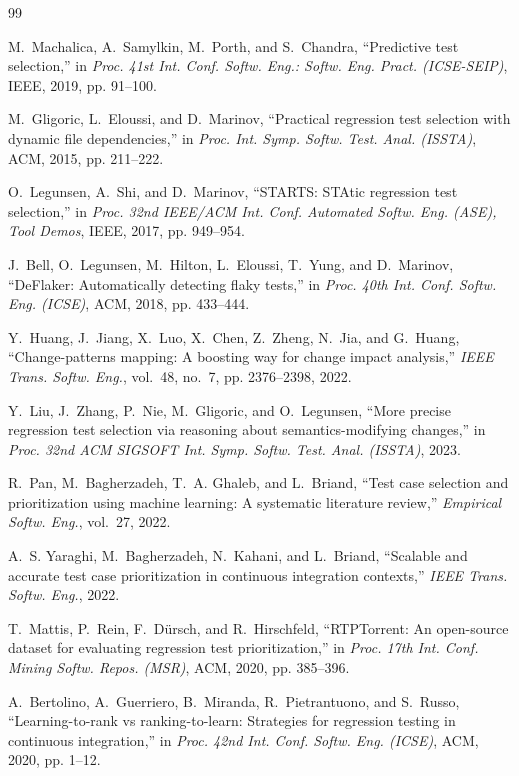 \documentclass[10pt,conference]{IEEEtran}
\begin{document}
\balance
\begin{thebibliography}{99}

M.~Machalica, A.~Samylkin, M.~Porth, and S.~Chandra, ``Predictive test selection,'' in \emph{Proc. 41st Int. Conf. Softw. Eng.: Softw. Eng. Pract. (ICSE-SEIP)}, IEEE, 2019, pp. 91--100.

M.~Gligoric, L.~Eloussi, and D.~Marinov, ``Practical regression test selection with dynamic file dependencies,'' in \emph{Proc. Int. Symp. Softw. Test. Anal. (ISSTA)}, ACM, 2015, pp. 211--222.

O.~Legunsen, A.~Shi, and D.~Marinov, ``{STARTS}: {STAtic} regression test selection,'' in \emph{Proc. 32nd IEEE/ACM Int. Conf. Automated Softw. Eng. (ASE), Tool Demos}, IEEE, 2017, pp. 949--954.

J.~Bell, O.~Legunsen, M.~Hilton, L.~Eloussi, T.~Yung, and D.~Marinov, ``{DeFlaker}: Automatically detecting flaky tests,'' in \emph{Proc. 40th Int. Conf. Softw. Eng. (ICSE)}, ACM, 2018, pp. 433--444.

Y.~Huang, J.~Jiang, X.~Luo, X.~Chen, Z.~Zheng, N.~Jia, and G.~Huang, ``Change-patterns mapping: A boosting way for change impact analysis,'' \emph{IEEE Trans. Softw. Eng.}, vol.~48, no.~7, pp. 2376--2398, 2022.

Y.~Liu, J.~Zhang, P.~Nie, M.~Gligoric, and O.~Legunsen, ``More precise regression test selection via reasoning about semantics-modifying changes,'' in \emph{Proc. 32nd ACM SIGSOFT Int. Symp. Softw. Test. Anal. (ISSTA)}, 2023.

R.~Pan, M.~Bagherzadeh, T.~A. Ghaleb, and L.~Briand, ``Test case selection and prioritization using machine learning: A systematic literature review,'' \emph{Empirical Softw. Eng.}, vol.~27, 2022.

A.~S. Yaraghi, M.~Bagherzadeh, N.~Kahani, and L.~Briand, ``Scalable and accurate test case prioritization in continuous integration contexts,'' \emph{IEEE Trans. Softw. Eng.}, 2022.

T.~Mattis, P.~Rein, F.~D{\"u}rsch, and R.~Hirschfeld, ``{RTPTorrent}: An open-source dataset for evaluating regression test prioritization,'' in \emph{Proc. 17th Int. Conf. Mining Softw. Repos. (MSR)}, ACM, 2020, pp. 385--396.

A.~Bertolino, A.~Guerriero, B.~Miranda, R.~Pietrantuono, and S.~Russo, ``Learning-to-rank vs ranking-to-learn: Strategies for regression testing in continuous integration,'' in \emph{Proc. 42nd Int. Conf. Softw. Eng. (ICSE)}, ACM, 2020, pp. 1--12.


\end{thebibliography}
\end{document}
